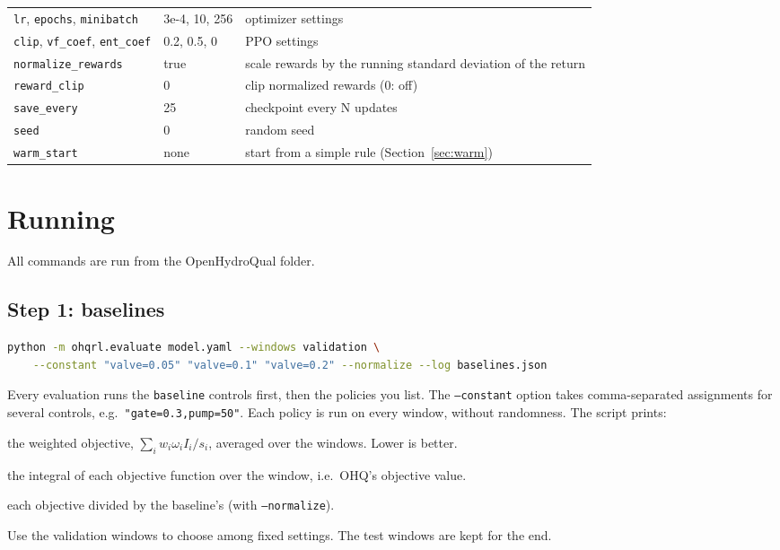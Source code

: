 \documentclass[11pt]{article}
\newcommand{\code}[1]{\texttt{#1}}
\begin{document}
\begin{longtable}{@{}p{3.6cm}p{2.4cm}p{8.6cm}@{}}
\code{lr}, \code{epochs}, \code{minibatch} & 3e-4, 10, 256 & optimizer settings\\
\code{clip}, \code{vf\_coef}, \code{ent\_coef} & 0.2, 0.5, 0 & PPO settings\\
\code{normalize\_rewards} & true & scale rewards by the running standard deviation of the return\\
\code{reward\_clip} & 0 & clip normalized rewards ($0$: off)\\
\code{save\_every} & 25 & checkpoint every N updates\\
\code{seed} & 0 & random seed\\
\code{warm\_start} & none & start from a simple rule (Section~\ref{sec:warm})\\
\bottomrule
\end{longtable}
\normalsize

\section{Running}

All commands are run from the OpenHydroQual folder.

\subsection{Step 1: baselines}
\begin{lstlisting}[language=bash]
python -m ohqrl.evaluate model.yaml --windows validation \
    --constant "valve=0.05" "valve=0.1" "valve=0.2" --normalize --log baselines.json
\end{lstlisting}
Every evaluation runs the \code{baseline} controls first, then the
policies you list. The \code{--constant} option takes comma-separated
assignments for several controls, e.g.\ \code{"gate=0.3,pump=50"}. Each
policy is run on every window, without randomness. The script prints:
\begin{description}[nosep]
\item[\code{J}] the weighted objective, $\sum_i w_i\omega_i I_i/s_i$,
  averaged over the windows. Lower is better.
\item[objective values] the integral of each objective function over the
  window, i.e.\ OHQ's objective value.
\item[\code{normalized}] each objective divided by the baseline's (with
  \code{--normalize}).
\end{description}
Use the validation windows to choose among fixed settings. The test
windows are kept for the end.
\end{document}
